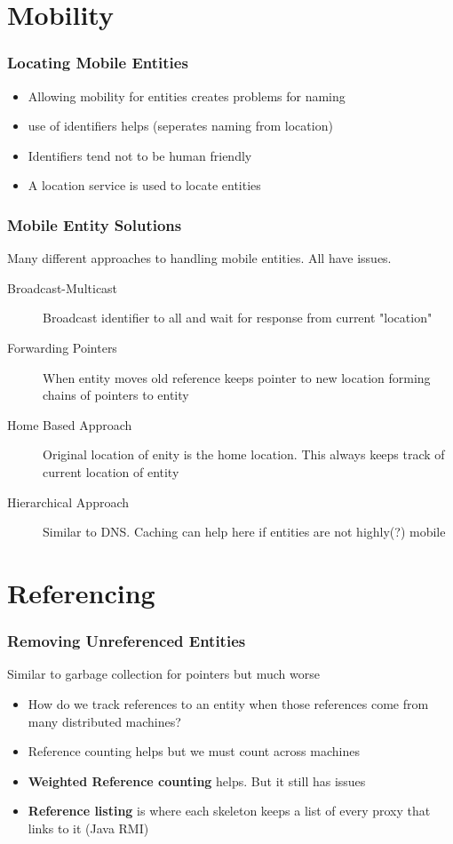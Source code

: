 \documentclass{beamer}
\begin{document}
\section{Mobility}
    \begin{frame}
    	\frametitle{Locating Mobile Entities}
    	\begin{itemize}
    		\item Allowing mobility for entities creates problems for naming
    		\item use of identifiers helps (seperates naming from location)
    		\item Identifiers tend not to be human friendly
    		\item A location service is used to locate entities
    	\end{itemize}

    \end{frame}
    \begin{frame}
    	\frametitle{Mobile Entity Solutions}
    	Many different approaches to handling mobile entities. All have issues.
    	\begin{description}
    		\item [Broadcast-Multicast] Broadcast identifier to all and wait for response from current "location"
    		\item [Forwarding Pointers] When entity moves old reference keeps pointer to new location forming chains of pointers to entity
    		\item[Home Based Approach] Original location of enity is the home location. This always keeps track of current location of entity
    		\item[Hierarchical Approach] Similar to DNS. Caching can help here if entities are not highly(?) mobile
    	\end{description}
    	
    \end{frame}    
    
\section{Referencing}
    \begin{frame}
    	\frametitle{Removing Unreferenced Entities}
    	Similar to garbage collection for pointers but much worse
    	\begin{itemize}
    		\item How do we track references to an entity when those references come from many distributed machines?
    		\item Reference counting helps but we must count across machines
    		\item \textbf{Weighted Reference counting} helps. But it still has issues
    		\item \textbf{Reference listing} is where each skeleton keeps a list of every proxy that links to it (Java RMI)
    	\end{itemize}
    	
    \end{frame} 
\end{document}
